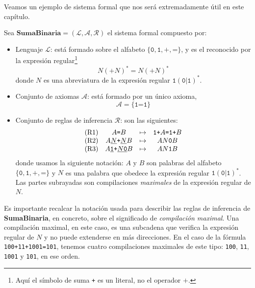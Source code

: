 Veamos un ejemplo de sistema formal que nos será extremadamente útil en este capítulo.

\begin{sistemaformal}\label{sf:suma-binaria}
Sea $\textbf{SumaBinaria}=(\mathcal{L}, \mathcal{A}, \mathcal{R})$ el sistema formal compuesto por:

\begin{itemize}
    \item Lenguaje $\mathcal{L}$: está formado sobre el alfabeto $\{\texttt{0}, \texttt{1}, \texttt{+}, \texttt{=}\}$, y es el reconocido por la expresión regular\footnote{Aquí el símbolo de suma \texttt{+} es un literal, no el operador $+$.}
    $$
        N(\texttt{+}N)^*=N(\texttt{+}N)^*
    $$
    donde $N$ es una abreviatura de la expresión regular $\texttt{1}(\texttt{0}|\texttt{1})^*$.
    \item Conjunto de axiomas $\mathcal{A}$: está formado por un único axioma,
    $$
        \mathcal{A} = \{\texttt{1=1}\}
    $$
    \item Conjunto de reglas de inferencia $\mathcal{R}$: son las siguientes:
    $$
    \begin{matrix}
    \text{(R1)} & A\texttt{=}B & \mapsto & \texttt{1+}A\texttt{=}\texttt{1+}B \\
    \text{(R2)} & A\underline{N}\texttt{+}\underline{N}B & \mapsto & AN\texttt{0}B \\
    \text{(R3)} & A\texttt{\underline{1}+}\underline{N\texttt{0}}B & \mapsto & AN\texttt{1}B
    \end{matrix}
    $$
    donde usamos la siguiente notación: $A$ y $B$ son palabras del alfabeto $\{\texttt{0}, \texttt{1}, \texttt{+}, \texttt{=}\}$ y $N$ es una palabra que obedece la expresión regular $\texttt{1}(\texttt{0}|\texttt{1})^*$. Las partes subrayadas son compilaciones \emph{maximales} de la expresión regular de $N$.
\end{itemize}
\end{sistemaformal}

Es importante recalcar la notación usada para describir las reglas de inferencia de \textbf{SumaBinaria}, en concreto, sobre el significado de \textit{compilación maximal}. Una compilación maximal, en este caso, es una subcadena que verifica la expresión regular de $N$ y no puede extenderse en más direcciones. En el caso de la fórmula \texttt{100+11+1001=101}, tenemos cuatro compilaciones maximales de este tipo: \texttt{100}, \texttt{11}, \texttt{1001} y \texttt{101}, en ese orden.


